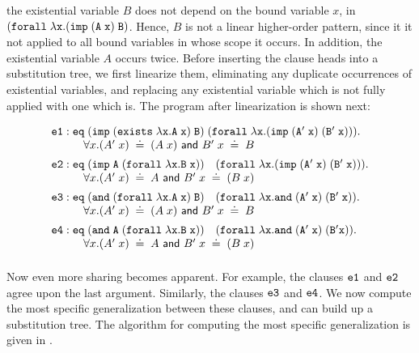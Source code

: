 \documentclass{acmconf}
\newcommand{\typeLF}{\tt{type}}
\newcommand{\propLF}{\tt{prop}}
\newcommand{\andLF}{\tt{and}\;}
\newcommand{\impLF}{\tt{imp}\;}
\newcommand{\forallLF}{\tt{forall}\;}
\newcommand{\existsLF}{\tt{exists}\;}
\newcommand{\eqLF}{\tt{eq}\;}
\newcommand{\eqilLF}{\tt{e1}}
\newcommand{\eqirLF}{\tt{e2}}
\newcommand{\eqalLF}{\tt{e3}}
\newcommand{\eqarLF}{\tt{e4}}
\newcommand{\unif}{\;\doteq\;}
\begin{document}
the existential variable $B$ does not depend on the bound variable
$x$, in $(\forallLF \lambda x. (\impLF (A\; x)\; B)$. Hence, $B$ is
not a linear higher-order pattern, since it it not applied to all
bound variables in whose scope it occurs. In addition, the existential
variable $A$ occurs twice. Before inserting the clause heads into a
substitution tree, we first linearize them, eliminating any duplicate
occurrences of existential variables, and replacing any existential
variable which is not fully applied with one which is. The program after
linearization is shown next:

\begin{small}
\[
\begin{array}{ll}
%
\eqilLF: \eqLF (\impLF (\existsLF \lambda x. A\; x)\; B)\;
                 (\forallLF \lambda x. (\impLF (A'\; x)\; (B'\;x))). \\
\hspace{1cm}\forall x. (A'\; x) \unif (A \; x) {\textsf{ and } } B'\;x   \unif B\\[0.5em]
\eqirLF: \eqLF (\impLF A\; (\forallLF \lambda x. B\;x))\quad
                 (\forallLF \lambda x. (\impLF (A'\;x) \; (B'\; x))).\\
\hspace{1cm} \forall x. (A'\; x) \unif A  {\textsf{ and }} B'\;x   \unif (B\;x)\\[0.5em]
\eqalLF: \eqLF (\andLF (\forallLF \lambda x. A \;x) \; B)\quad
                 (\forallLF \lambda x. \andLF (A'\; x) \; (B'\;x)).\\
\hspace{1cm} \forall x. (A'\; x) \unif (A \; x) {\textsf{ and }} B'\;x   \unif B\\[0.5em]
\eqarLF: \eqLF (\andLF A \; (\forallLF \lambda x. B\; x)) \quad
                 (\forallLF \lambda x. \andLF (A'\;x) \; (B' x)).\\
\hspace{1cm} \forall x. (A'\; x) \unif A  {\textsf{ and }} B'\;x   \unif (B\;x)\\[0.5em]
\end{array}
\]
\end{small}

Now even more sharing becomes apparent. For example, the clauses
$\eqilLF$ and $\eqirLF$ agree upon the last argument. Similarly, the
clauses $\eqalLF$ and $\eqarLF$. We now compute the most specific
generalization between these clauses, and can build up a substitution
tree. The algorithm for computing the most specific generalization is
given in \cite{Pientka03phd,Pientka:ICLP03}.
\end{document}
